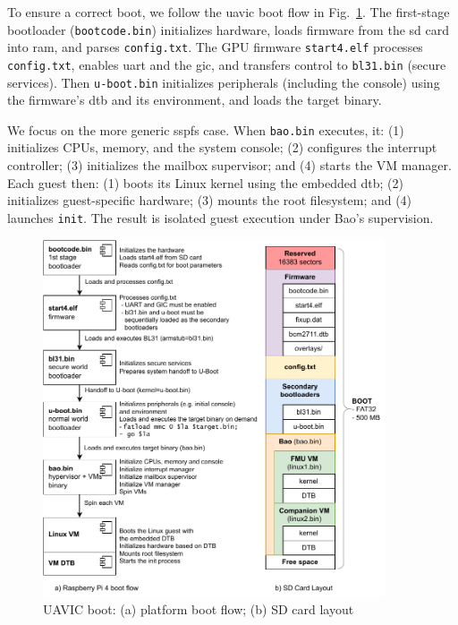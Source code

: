 To ensure a correct boot, we follow the \gls{uavic} boot flow in
Fig.~\ref{fig:uav-main-rpi4-boot}. The first-stage bootloader
(\lstinline{bootcode.bin}) initializes hardware, loads firmware from the
\gls{sd} card into \gls{ram}, and parses \lstinline{config.txt}. The GPU
firmware \lstinline{start4.elf} processes \lstinline{config.txt}, enables
\gls{uart} and the \gls{gic}, and transfers control to \lstinline{bl31.bin}
(secure services). Then \lstinline{u-boot.bin} initializes peripherals (including
the console) using the firmware’s \gls{dtb} and its environment, and loads the
target binary.

We focus on the more generic \gls{sspfs} case.
%
When \lstinline{bao.bin} executes, it:
(1) initializes CPUs, memory, and the system console;
(2) configures the interrupt controller;
(3) initializes the mailbox supervisor; and
(4) starts the VM manager.
Each guest then:
(1) boots its Linux kernel using the embedded \gls{dtb};
(2) initializes guest-specific hardware;
(3) mounts the root filesystem; and
(4) launches \lstinline{init}.
The result is isolated guest execution under Bao's supervision.

\begin{figure}[!hbt]
  \centering
  \includegraphics[width=0.9\textwidth]{./img/pdf/uav-main-rpi4-boot}
  \caption{UAVIC boot: (a) platform boot flow; (b) SD card layout}%
  \label{fig:uav-main-rpi4-boot}
\end{figure}

